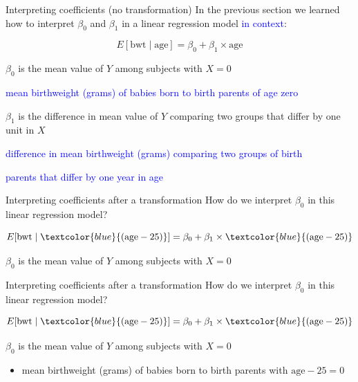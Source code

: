 \documentclass[10pt,t]{beamer}
\begin{document}
\begin{frame}{Interpreting coefficients (no transformation)}
In the previous section we learned how to interpret $\beta_0$ and $\beta_1$ in a linear regression model \textcolor{blue}{in context}:

$$
E[\text{bwt} \mid \text{age}] = \beta_0 + \beta_1 \times \text{age}
$$

\vspace{0.2cm}

$\beta_0$ is the mean value of $Y$ among subjects with $X = 0$

\hspace{0.3cm} \textcolor{blue}{mean birthweight (grams) of babies born to birth parents of age zero}

\vspace{0.3cm}

$\beta_1$ is the difference in mean value of $Y$ comparing two groups that differ by one unit in $X$

\hspace{0.3cm}  \textcolor{blue}{difference in mean birthweight (grams) comparing two groups of birth} 
	
\hspace{0.3cm} \textcolor{blue}{parents that differ by one year in age}

\end{frame}

\begin{frame}{Interpreting coefficients after a transformation}
How do we interpret $\beta_0$ in this linear regression model?

$$
E[\text{bwt} \mid \textcolor{blue}{(\text{age} - 25)}] = \beta_0 + \beta_1 \times \textcolor{blue}{(\text{age} - 25)}
$$

\vspace{0.2cm}

$\beta_0$ is the mean value of $Y$ among subjects with $X = 0$


\end{frame}

\begin{frame}{Interpreting coefficients after a transformation}
How do we interpret $\beta_0$ in this linear regression model?

$$
E[\text{bwt} \mid \textcolor{blue}{(\text{age} - 25)}] = \beta_0 + \beta_1 \times \textcolor{blue}{(\text{age} - 25)}
$$

\vspace{0.2cm}

$\beta_0$ is the mean value of $Y$ among subjects with $X = 0$

\begin{itemize}
	\item[] mean birthweight (grams) of babies born to birth parents with $\text{age} - 25 = 0$
\end{itemize} 


\end{frame}
\end{document}
